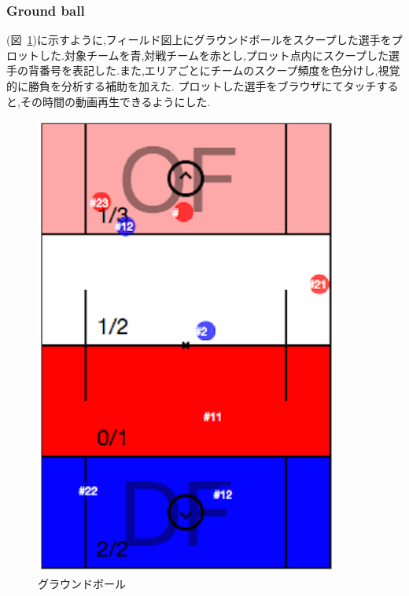 \documentclass[sotsuron]{kuee}
\begin{document}
			\subsubsection{Ground ball}
				(図~\ref{fig:gb})に示すように,フィールド図上にグラウンドボールをスクープした選手をプロットした.対象チームを青,対戦チームを赤とし,プロット点内にスクープした選手の背番号を表記した.また,エリアごとにチームのスクープ頻度を色分けし,視覚的に勝負を分析する補助を加えた.
				プロットした選手をブラウザにてタッチすると,その時間の動画再生できるようにした.
					\begin{figure}
						\begin{center}
							\includegraphics[width=10cm]{./eps/gb.eps}
						\end{center}
						\caption{グラウンドボール}
				  		\label{fig:gb}
					\end{figure}
\end{document}
